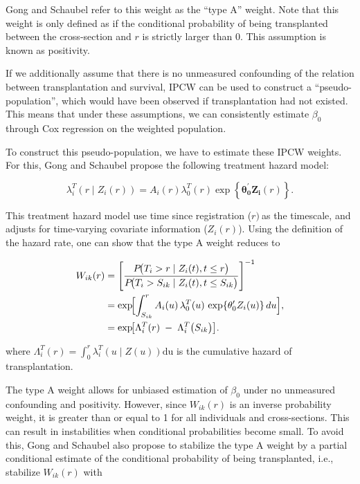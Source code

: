 \documentclass[11pt,twoside,]{book}
\begin{document}
Gong and Schaubel refer to this weight as the ``type A'' weight. Note that
this weight is only defined as if the conditional probability of being
transplanted between the cross-section and \(r\) is strictly larger than
0. This assumption is known as positivity.

If we additionally assume that there is no unmeasured confounding of the
relation between transplantation and survival, IPCW can be used to
construct a ``pseudo-population'', which would have been observed if transplantation
had not existed. This means that under these assumptions, we can consistently
estimate \(\beta_0\) through Cox regression on the weighted population.

To construct this pseudo-population, we have to estimate these IPCW weights.
For this, Gong and Schaubel propose the following treatment hazard model:

\[\lambda_{i}^{T}\left( r \middle| Z_{i}\left( r \right) \right) = A_{i}\left( r \right)\lambda_{0}^{T}\left( r \right)\exp\left\{ \mathbf{\theta}_{\mathbf{0}}^{'}\mathbf{Z}_{\mathbf{i}}\left( r \right) \right\}.\]

This treatment hazard model use time since registration (\(r)\ \)as the
timescale, and adjusts for time-varying covariate information
(\(Z_{i}( r )\)). Using the definition of the hazard rate, one
can show that the type A weight reduces to

\[
\begin{aligned}
W_{ik}(r) 
  &= \left[ \frac{P\!\bigl(T_i > r \mid Z_i(t), t \le r\bigr)}
                 {P\!\bigl(T_i > S_{ik} \mid Z_i(t), t \le S_{ik}\bigr)} 
       \right]^{-1}\\
     &= \exp\!\Bigl[
            \int_{S_{ik}}^{r} A_i(u)\,\lambda_0^T(u)\,
                            \exp\{\theta_0' Z_i(u)\}\,du
       \Bigr],\\
  &= \exp\!\bigl[\Lambda_i^T(r) 
                \;-\;\Lambda_i^T\bigl(S_{ik}\bigr)\bigr].
\end{aligned}
\]

where
\(\Lambda_{i}^{T}\left( r \right) = \int_{0}^{r}{\lambda_{i}^{T}\left( u \middle| Z\left( u \right) \right)\text{du}}\)
is the cumulative hazard of transplantation.

The type A weight allows for unbiased estimation of \(\beta_{0}\) under no
unmeasured confounding and positivity. However, since
\(W_{ik}( r )\) is an inverse probability weight, it is
greater than or equal to 1 for all individuals and cross-sections. This
can result in instabilities when conditional probabilities become small.
To avoid this, Gong and Schaubel also propose to stabilize the type A
weight by a partial conditional estimate of the conditional probability
of being transplanted, i.e., stabilize \(W_{ik}( r )\)
with
\end{document}
